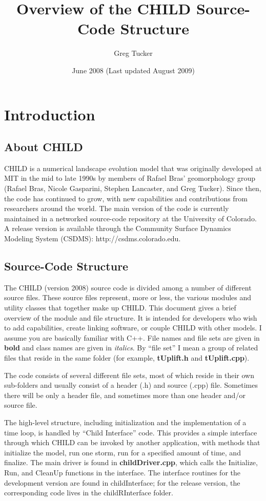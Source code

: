 \documentclass[12pt]{article}
\title{Overview of the CHILD Source-Code Structure}
\author{Greg Tucker}
\date{June 2008 (Last updated August 2009)} %
\begin{document}
\maketitle
\tableofcontents

\section{Introduction}

\subsection{About CHILD}

CHILD is a numerical landscape evolution model that was originally developed at MIT in the mid to late 1990s by members of Rafael Bras' geomorphology group (Rafael Bras, Nicole Gasparini, Stephen Lancaster, and Greg Tucker). Since then, the code has continued to grow, with new capabilities and contributions from researchers around the world. The main version of the code is currently maintained in a networked source-code repository at the University of Colorado. A release version is available through the Community Surface Dynamics Modeling System (CSDMS): http://csdms.colorado.edu.

\subsection{Source-Code Structure}

The CHILD (version 2008) source code is divided among a number of different 
source files. These source files represent, more or less, the various modules 
and utility classes that together make up CHILD. This document gives a brief 
overview of the module and file structure. It is intended for developers who 
wish to add capabilities, create linking software, or couple CHILD with other 
models. I assume you are basically familiar with C++. File names and file sets 
are given in {\bf bold} and class names are given in {\em italics}. By 
``file set'' I mean a group of related files that reside in the same folder 
(for example, {\bf tUplift.h} and {\bf tUplift.cpp}).

The code consists of several different file sets, most of which reside in their own sub-folders and usually consist of a header (.h) and source (.cpp) file. Sometimes there will be only a header file, and sometimes more than one header and/or source file.

The high-level structure, including initialization and the implementation of a time loop, is handled by ``Child Interface'' code. This provides a
simple interface through which CHILD can be invoked by another application, with
methods that initialize the model, run one storm, run for a specified
amount of time, and finalize. The main driver is found in {\bf childDriver.cpp}, which calls the Initialize, Run, and CleanUp functions in the interface. The interface routines for the development version are found in childInterface; for the release version, the corresponding code lives in the childRInterface folder.
\end{document}
